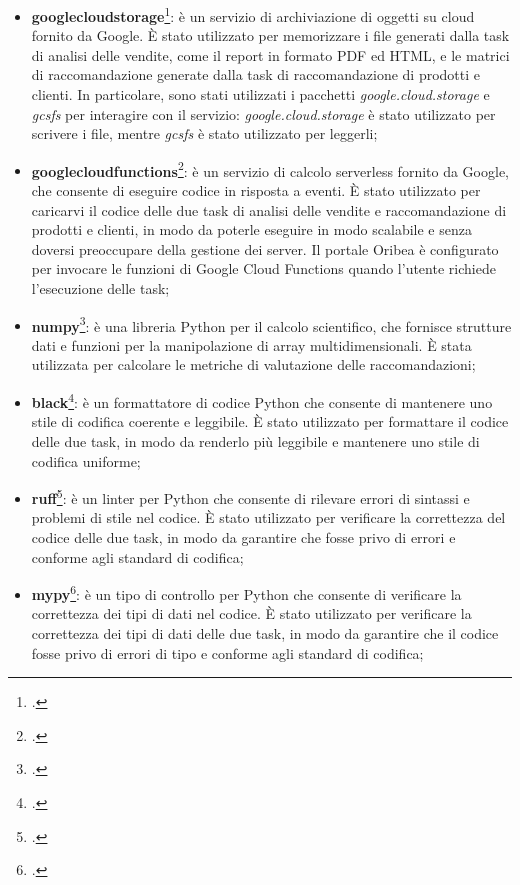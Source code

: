 \begin{itemize}
    \item \textbf{\gls{googlecloudstorage}}\footcite{site:google-cloud-storage}: è un servizio di archiviazione di oggetti su cloud fornito da Google. È stato utilizzato per memorizzare i file generati dalla task di analisi delle vendite, come il report in formato PDF ed HTML, e le matrici di raccomandazione generate dalla task di raccomandazione di prodotti e clienti. In particolare, sono stati utilizzati i pacchetti \emph{google.cloud.storage} e \emph{gcsfs} per interagire con il servizio: \emph{google.cloud.storage} è stato utilizzato per scrivere i file, mentre \emph{gcsfs} è stato utilizzato per leggerli;
    
    \item \textbf{\gls{googlecloudfunctions}}\footcite{site:google-cloud-functions}: è un servizio di calcolo serverless fornito da Google, che consente di eseguire codice in risposta a eventi. È stato utilizzato per caricarvi il codice delle due task di analisi delle vendite e raccomandazione di prodotti e clienti, in modo da poterle eseguire in modo scalabile e senza doversi preoccupare della gestione dei server. Il portale Oribea è configurato per invocare le funzioni di Google Cloud Functions quando l'utente richiede l'esecuzione delle task;
    
    \item \textbf{\gls{numpy}}\footcite{site:numpy}: è una libreria Python per il calcolo scientifico, che fornisce strutture dati e funzioni per la manipolazione di array multidimensionali. È stata utilizzata per calcolare le metriche di valutazione delle raccomandazioni;
    
    \item \textbf{\gls{black}}\footcite{site:black}: è un formattatore di codice Python che consente di mantenere uno stile di codifica coerente e leggibile. È stato utilizzato per formattare il codice delle due task, in modo da renderlo più leggibile e mantenere uno stile di codifica uniforme;
    
    \item \textbf{\gls{ruff}}\footcite{site:ruff}: è un linter per Python che consente di rilevare errori di sintassi e problemi di stile nel codice. È stato utilizzato per verificare la correttezza del codice delle due task, in modo da garantire che fosse privo di errori e conforme agli standard di codifica;
    
    \item \textbf{\gls{mypy}}\footcite{site:mypy}: è un tipo di controllo per Python che consente di verificare la correttezza dei tipi di dati nel codice. È stato utilizzato per verificare la correttezza dei tipi di dati delle due task, in modo da garantire che il codice fosse privo di errori di tipo e conforme agli standard di codifica;
    

\end{itemize}
